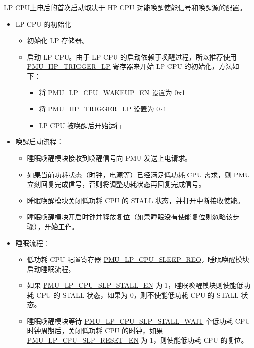 \documentclass[main\_\_CN.tex]{subfiles}
\begin{document}
LP CPU上电后的首次启动取决于 HP CPU 对能唤醒使能信号和唤醒源的配置。
\begin{itemize}
    \item LP CPU 的初始化
        \begin{itemize}
            \item 初始化 LP 存储器。
            \item 启动 LP CPU。由于 LP CPU 的启动依赖于唤醒过程，所以推荐使用 \hyperref[fielddesc:PMUHPTRIGGERLP]{PMU\_HP\_TRIGGER\_LP} 寄存器来开始 LP CPU 的初始化，方法如下：
            \begin{itemize}
               \item 将 \hyperref[fielddesc:PMULPCPUWAKEUPEN]{PMU\_LP\_CPU\_WAKEUP\_EN} 设置为 0x1
               \item 将 \hyperref[fielddesc:PMUHPTRIGGERLP]{PMU\_HP\_TRIGGER\_LP} 设置为 0x1
               \item LP CPU 被唤醒后开始运行
            \end{itemize}
        \end{itemize}
    \item 唤醒启动流程：
    \begin{itemize}
     \item 睡眠唤醒模块接收到唤醒信号向 PMU 发送上电请求。
     \item 如果当前功耗状态（时钟，电源等）已经满足低功耗 CPU 需求，则 PMU 立刻回复完成信号，否则将调整功耗状态再回复完成信号。
     \item 睡眠唤醒模块关闭低功耗 CPU 的 STALL 状态，并打开中断接收使能。
     \item 睡眠唤醒模块开启时钟并释放复位（如果睡眠没有使能复位则忽略该步骤），开始工作。
   \end{itemize}

    \item 睡眠流程：
    \begin{itemize}
    \item 低功耗 CPU 配置寄存器 \hyperref[fielddesc:PMULPCPUSLEEPREQ]{PMU\_LP\_CPU\_SLEEP\_REQ}，睡眠唤醒模块启动睡眠流程。
    \item 如果 \hyperref[fielddesc:PMULPCPUSLPSTALLEN]{PMU\_LP\_CPU\_SLP\_STALL\_EN} 为 1，睡眠唤醒模块则使能低功耗 CPU 的 STALL 状态，如果为 0，则不使能低功耗 CPU 的 STALL 状态。
    \item 睡眠唤醒模块等待 \hyperref[fielddesc:PMULPCPUSLPSTALLWAIT]{PMU\_LP\_CPU\_SLP\_STALL\_WAIT} 个低功耗 CPU 时钟周期后，关闭低功耗 CPU 的时钟，如果 \hyperref[fielddesc:PMULPCPUSLPRESETEN]{PMU\_LP\_CPU\_SLP\_RESET\_EN} 为 1，则使能低功耗 CPU 的复位。
   \end{itemize}
   \end{itemize}
\end{document}
